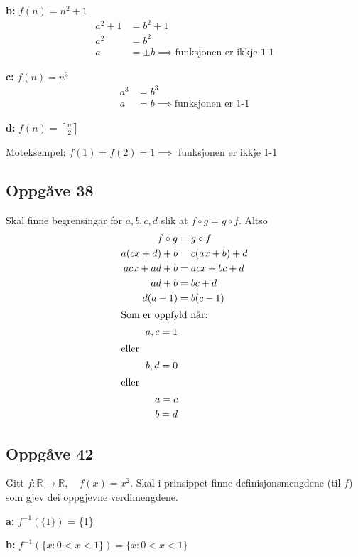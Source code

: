 \documentclass[a4paper, 11pt]{article}
\newcommand{\deloppg}[1]{\vspace{1mm}\noindent \textbf{\themecolor{#1:}}}
\newcommand{\themeshade}{Mahogany}
\newcommand{\themecolor}[1]{\textcolor{\themeshade}{#1}}
\begin{document}
\deloppg{b} \(f(n) = n^2 + 1\)
\begin{align*}
    a^2 + 1 &= b^2 + 1 \\
    a^2 &= b^2 \\
    a &= \pm b \implies \text{funksjonen er ikkje 1-1}
\end{align*}

\deloppg{c} \(f(n) = n^3\)
\begin{align*}
    a^3 &= b^3 \\
    a &= b \implies \text{funksjonen er 1-1}
\end{align*}

\deloppg{d} \(f(n) = \left\lceil \frac{n}{2} \right\rceil \)

\vspace{3mm}
\noindent Moteksempel: \(f(1) = f(2) = 1 \implies \) funksjonen er ikkje 1-1


\subsection*{Oppgåve 38}
Skal finne begrensingar for \(a,b,c,d\) slik at \(f \circ g = g \circ f\). Altso
\begin{align*}
    f \circ g &= g \circ f \\
    a(cx + d) + b &= c(ax+b) + d \\
    acx + ad + b &= acx + bc + d \\
    ad + b &= bc + d \\
    d(a-1) &= b(c-1) \\
    \intertext{Som er oppfyld når:}
    a,c = 1 \\
    \intertext{eller}
    b,d = 0 \\
    \intertext{eller}
    a=c \\ b=d
\end{align*}

\newpage
\subsection*{Oppgåve 42}
Gitt \(f: \mathbb{R \rightarrow \mathbb{R}}, \quad f(x)=x^2\). Skal i prinsippet finne
definisjonsmengdene (til \(f\)) som gjev dei oppgjevne verdimengdene.

\vspace{3mm}
\deloppg{a} \(f^{-1}(\{1\})\) = \{1\}

\vspace{3mm}
\deloppg{b} \(f^{-1}(\{x : 0 < x < 1\}) = \{x : 0 < x < 1\}\)
\end{document}
